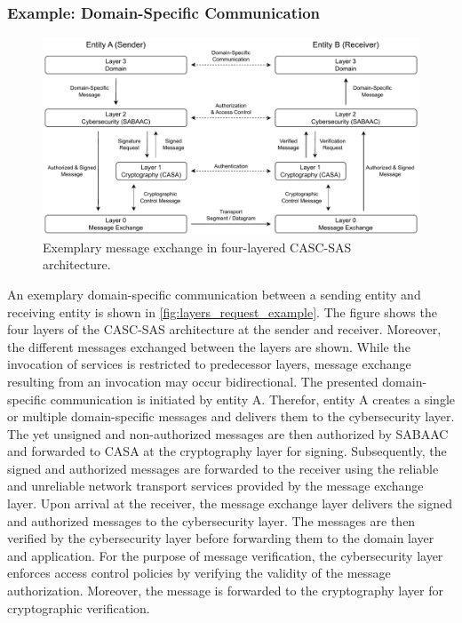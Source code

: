\subsubsection{Example: Domain-Specific Communication}
\begin{figure}
    \centering
    \includegraphics[width=1.0\linewidth]{figures/layers_request_example.drawio.pdf}
    \caption{Exemplary message exchange in four-layered CASC-SAS architecture.}
    \label{fig:layers_request_example}
\end{figure}
An exemplary domain-specific communication between a sending entity and receiving entity is shown in \autoref{fig:layers_request_example}.
The figure shows the four layers of the CASC-SAS architecture at the sender and receiver.
Moreover, the different messages exchanged between the layers are shown.
While the invocation of services is restricted to predecessor layers, message exchange resulting from an invocation may occur bidirectional.
The presented domain-specific communication is initiated by entity A.
Therefor, entity A creates a single or multiple domain-specific messages and delivers them to the cybersecurity layer.
The yet unsigned and non-authorized messages are then authorized by SABAAC and forwarded to CASA at the cryptography layer for signing.
Subsequently, the signed and authorized messages are forwarded to the receiver using the reliable and unreliable network transport services provided by the message exchange layer.
Upon arrival at the receiver, the message exchange layer delivers the signed and authorized messages to the cybersecurity layer.
The messages are then verified by the cybersecurity layer before forwarding them to the domain layer and application.
For the purpose of message verification, the cybersecurity layer enforces access control policies by verifying the validity of the message authorization.
Moreover, the message is forwarded to the cryptography layer for cryptographic verification.


